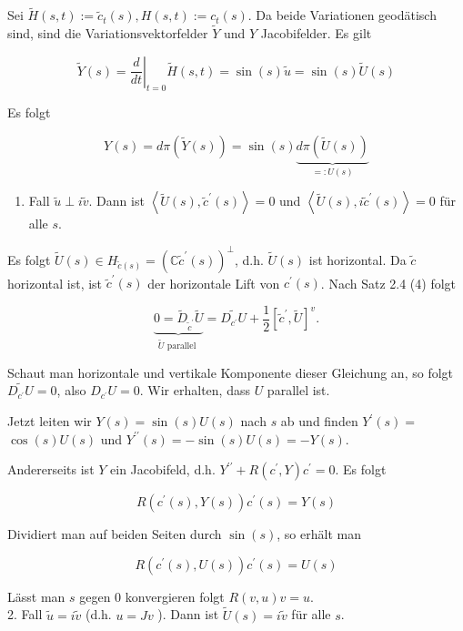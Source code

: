\documentclass[10pt, letterpaper]{article}
\begin{document}
Sei $\tilde{H}(s, t):=\tilde{c}_{t}(s), H(s, t):=c_{t}(s)$. Da beide Variationen geodätisch sind, sind die Variationsvektorfelder $\tilde{Y}$ und $Y$ Jacobifelder. Es gilt

$$
\tilde{Y}(s)=\left.\frac{d}{d t}\right|_{t=0} \tilde{H}(s, t)=\sin (s) \tilde{u}=\sin (s) \tilde{U}(s)
$$

Es folgt


\begin{equation*}
Y(s)=d \pi(\tilde{Y}(s))=\sin (s) \underbrace{d \pi(\tilde{U}(s))}_{=: U(s)} \tag{9}
\end{equation*}


\begin{enumerate}
  \item Fall $\tilde{u} \perp i \tilde{v}$. Dann ist $\left\langle\tilde{U}(s), \tilde{c}^{\prime}(s)\right\rangle=0$ und $\left\langle\tilde{U}(s), i \tilde{c}^{\prime}(s)\right\rangle=0$ für alle $s$.
\end{enumerate}

Es folgt $\tilde{U}(s) \in H_{\tilde{c}(s)}=\left(\mathbb{C} \tilde{c}^{\prime}(s)\right)^{\perp}$, d.h. $\tilde{U}(s)$ ist horizontal. Da $\tilde{c}$ horizontal ist, ist $\tilde{c}^{\prime}(s)$ der horizontale Lift von $c^{\prime}(s)$. Nach Satz 2.4 (4) folgt

$$
\underbrace{0=\tilde{D}_{\tilde{c}^{\prime}} \tilde{U}}_{\tilde{U} \text { parallel }}=\widetilde{D_{c^{\prime}} U}+\frac{1}{2}\left[\tilde{c}^{\prime}, \tilde{U}\right]^{v} .
$$

Schaut man horizontale und vertikale Komponente dieser Gleichung an, so folgt $\widetilde{D_{c^{\prime}} U}=0$, also $D_{c^{\prime}} U=0$. Wir erhalten, dass $U$ parallel ist.

Jetzt leiten wir $Y(s)=\sin (s) U(s)$ nach $s$ ab und finden $Y^{\prime}(s)=$ $\cos (s) U(s)$ und $Y^{\prime \prime}(s)=-\sin (s) U(s)=-Y(s)$.

Andererseits ist $Y$ ein Jacobifeld, d.h. $Y^{\prime \prime}+R\left(c^{\prime}, Y\right) c^{\prime}=0$. Es folgt

$$
R\left(c^{\prime}(s), Y(s)\right) c^{\prime}(s)=Y(s)
$$

Dividiert man auf beiden Seiten durch $\sin (s)$, so erhält man

$$
R\left(c^{\prime}(s), U(s)\right) c^{\prime}(s)=U(s)
$$

Lässt man $s$ gegen 0 konvergieren folgt $R(v, u) v=u$.\\
2. Fall $\tilde{u}=i \tilde{v}$ (d.h. $u=J v$ ). Dann ist $\tilde{U}(s)=i \tilde{v}$ für alle $s$.
\end{document}

